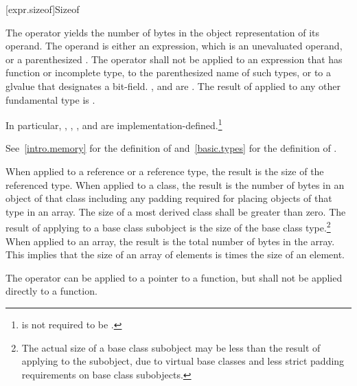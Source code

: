 [expr.sizeof]{Sizeof}

\pnum
{}%
%
%
The  operator yields the number of bytes in the object
representation of its operand. The operand is either an expression,
which is an unevaluated operand, or a parenthesized
.
%
The  operator shall not be applied to an expression that
has function or incomplete type,
to the parenthesized name of such
types, or to a glvalue that designates a bit-field.
,  and
 are . The result of
 applied to any other fundamental
type is .
\begin{note}
In particular, , ,
, and  are
implementation-defined.\footnote{ is not required to be .}
\end{note}
\begin{note}
See~\ref{intro.memory} for the definition of 
and~\ref{basic.types} for the definition of .
\end{note}

\pnum
{}%
When applied to a reference or a reference type, the result is the size
of the referenced type.
%
When applied to a class, the result is the number of bytes in an object
of that class including any padding required for placing objects of that
type in an array. The size of a most derived class shall be greater than
zero. The result of applying  to a
base class subobject is the size of the base class type.\footnote{The actual
size of a base class subobject may be less than the result of
applying  to the subobject, due to virtual base classes
and less strict padding requirements on base class subobjects.}
%
When applied to an array, the result is the total number of bytes in the
array. This implies that the size of an array of  elements is
 times the size of an element.

\pnum
The  operator can be applied to a pointer to a function,
but shall not be applied directly to a function.

